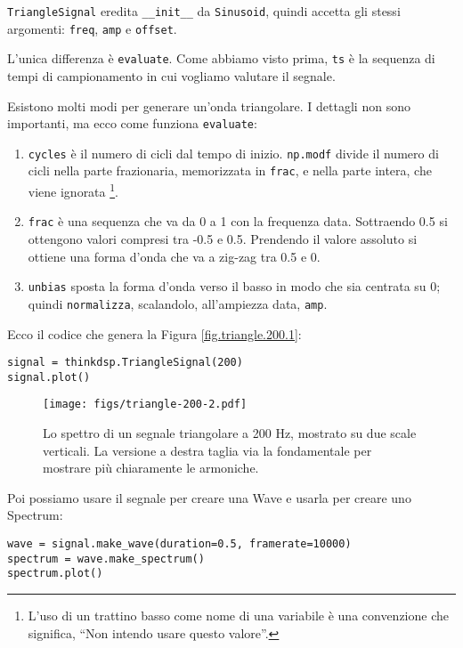 \documentclass[12pt,a4paper]{book}
\begin{document}
{\tt TriangleSignal} eredita \verb"__init__" da {\tt Sinusoid}, quindi accetta gli stessi argomenti: {\tt freq}, {\tt amp} e {\tt offset}.

L'unica differenza è {\tt evaluate}. Come abbiamo visto prima, {\tt ts} è la sequenza di tempi di campionamento in cui vogliamo valutare il segnale.

Esistono molti modi per generare un'onda triangolare. I dettagli non sono importanti, ma ecco come funziona {\tt evaluate}:

\begin{enumerate} 

\item {\tt cycles} è il numero di cicli dal tempo di inizio. {\tt np.modf} divide il numero di cicli nella parte frazionaria, memorizzata in {\tt frac}, e nella parte intera, che viene ignorata \footnote{L'uso di un trattino basso come nome di una variabile è una convenzione che significa, ``Non intendo usare questo valore''.}.

\item {\tt frac} è una sequenza che va da 0 a 1 con la frequenza data. Sottraendo 0.5 si ottengono valori compresi tra -0.5 e 0.5. Prendendo il valore assoluto si ottiene una forma d'onda che va a zig-zag tra 0.5 e 0.

\item {\tt unbias} sposta la forma d'onda verso il basso in modo che sia centrata su 0; quindi {\tt normalizza}, scalandolo, all'ampiezza data, {\tt amp}.

\end{enumerate} 

Ecco il codice che genera la Figura \ref{fig.triangle.200.1}:

\begin{verbatim} 
signal = thinkdsp.TriangleSignal(200)
signal.plot()
 \end{verbatim} 

\begin{figure} 

\centerline{\texttt{[image: figs/triangle-200-2.pdf]}} \caption{Lo spettro di un segnale triangolare a 200 Hz, mostrato su due scale verticali. La versione a destra taglia via la fondamentale per mostrare più chiaramente le armoniche.} \label{fig.triangle.200.2} \end{figure} 

Poi possiamo usare il segnale per creare una Wave e usarla per creare uno Spectrum:

\begin{verbatim} 
wave = signal.make_wave(duration=0.5, framerate=10000)
spectrum = wave.make_spectrum()
spectrum.plot()
 \end{verbatim} 
\end{document}
